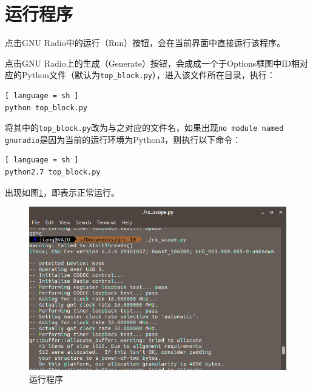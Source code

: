 	\section{运行程序}
		\par 点击GNU Radio中的运行（Run）按钮，会在当前界面中直接运行该程序。
		\par 点击GNU Radio上的生成（Generate）按钮，会成成一个于Options框图中ID相对应的Python文件（默认为\lstinline[language=sh]{top_block.py}），进入该文件所在目录，执行：
		\begin{lstlisting}[ language = sh ]
python top_block.py
		\end{lstlisting}
		\par 将其中的\lstinline[language=sh]{top_block.py}改为与之对应的文件名，如果出现\lstinline[language=sh]{no module named gnuradio}是因为当前的运行环境为Python3，则执行以下命令：
		\begin{lstlisting}[ language = sh ]
python2.7 top_block.py
		\end{lstlisting}
		\par 出现如图\ref{fig:dvbt_runtime}，即表示正常运行。
		\begin{figure}[htp]
			\centering
			\includegraphics[width=13cm]{figures/dvbt_runtime.png}
			\caption{运行程序}
			\label{fig:dvbt_runtime}
		\end{figure}
		
				
